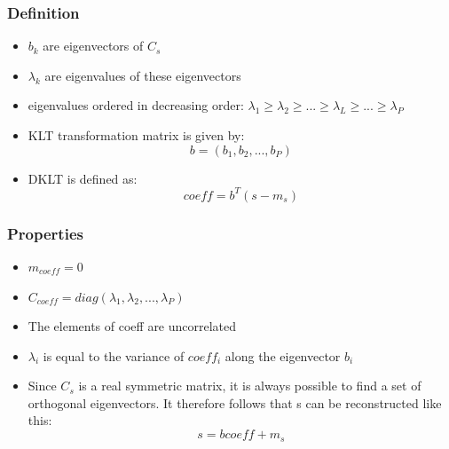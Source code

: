 \documentclass{article}
\begin{document}
\subsubsection{Definition}
\begin{itemize}
    \item $b_k$ are eigenvectors of $C_s$ \\
    \item $\lambda_k$ are eigenvalues of these eigenvectors \\
    \item eigenvalues ordered in decreasing order: $\lambda_1 \geq \lambda_2 \geq ... \geq \lambda_L \geq ... \geq \lambda_{P}$
    \item KLT transformation matrix is given by: \begin{equation}
        b = (b_1, b_2, ..., b_P)
    \end{equation}
    \item DKLT is defined as: \begin{equation}
        coeff = b^T (s - m_s)
    \end{equation}
\end{itemize}
\subsubsection{Properties}
\begin{itemize}
    \item $m_{coeff} = 0$ 
    \item $C_{coeff} = diag(\lambda_1, \lambda_2, ..., \lambda_P)$
    \item The elements of coeff are uncorrelated
    \item $\lambda_i$ is equal to the variance of $coeff_i$ along the eigenvector $b_i$
    \item Since $C_s$ is a real symmetric matrix, it is always possible to find
    a set of orthogonal eigenvectors. It therefore follows that s can be reconstructed like this:
    \begin{equation}
        s = b coeff + m_s
    \end{equation}
\end{itemize}
\end{document}
